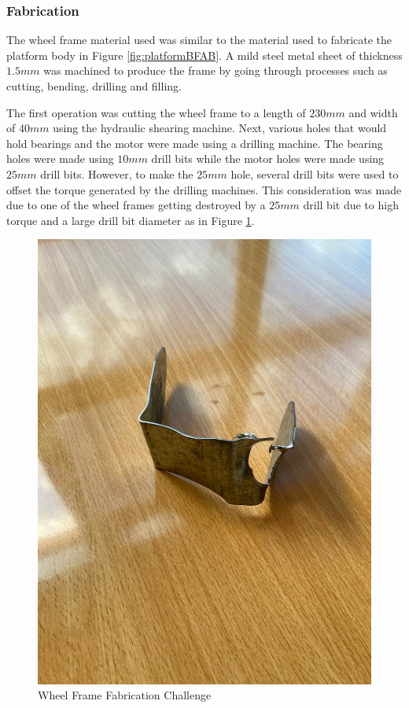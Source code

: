 \subsubsection{Fabrication}
The wheel frame material used was similar to the material used to fabricate the platform body in Figure \ref{fig:platformBFAB}. A mild steel metal sheet of thickness $1.5mm$ was machined to produce the frame by going through processes such as cutting, bending, drilling and filling.
\par
The first operation was cutting the wheel frame to a length of $230mm$ and width of $40mm$ using the hydraulic shearing machine. Next, various holes that would hold bearings and the motor were made using a drilling machine. The bearing holes were made using $10mm$ drill bits while the motor holes were made using $25mm$ drill bits. However, to make the $25mm$ hole, several drill bits were used to offset the torque generated by the drilling machines. This consideration was made due to one of the wheel frames getting destroyed by a $25mm$ drill bit due to high torque and a large drill bit diameter as in Figure \ref{fig:frameBAD}. 

\begin{figure}[H]
    \centering
    \includegraphics[scale = 0.3]{Figures/frameBAD.jpg}
    \caption{Wheel Frame Fabrication Challenge}
    \label{fig:frameBAD}
\end{figure}

